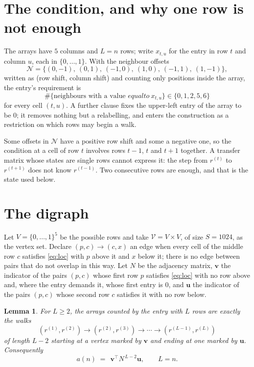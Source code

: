 \documentclass[11pt,a4paper]{article}
\theoremstyle{plain}
\newtheorem{lemma}[theorem]{Lemma}
\theoremstyle{definition}
\begin{document}
\section{The condition, and why one row is not enough}

The arrays have $5$ columns and $L=n$ rows; write $x_{t,u}$ for the entry in
row $t$ and column $u$, each in $\{0,\dots,1\}$. With the neighbour offsets
\[
\mathcal N=\{(0,-1),\ (0,1),\ (-1,0),\ (1,0),\ (-1,1),\ (1,-1)\},
\]
written as (row shift, column shift) and counting only positions inside the array, the
entry's requirement is
\begin{equation}\label{eq:loc}
\#\{\text{neighbours with a value }equal to\ x_{t,u}\}\in\{0,1,2,5,6\}
\end{equation}
for every cell $(t,u)$. A further clause fixes the upper-left entry of the array to be $0$; it removes nothing but a relabelling, and enters the construction as a restriction on which rows may begin a walk.

Some offsets in $\mathcal N$ have a positive row shift and some a negative one, so the
condition at a cell of row $t$ involves rows $t-1$, $t$ and $t+1$ together. A transfer
matrix whose states are single rows cannot express it: the step from $r^{(t)}$ to
$r^{(t+1)}$ does not know $r^{(t-1)}$. Two consecutive rows are enough, and that is
the state used below.

\section{The digraph}

Let $V=\{0,\dots,1\}^{5}$ be the possible rows and take
$\mathcal V=V\times V$, of size $S=1024$, as the vertex set. Declare $(p,c)\to(c,x)$ an edge
when every cell of the middle row $c$ satisfies \eqref{eq:loc} with $p$ above it and $x$
below it; there is no edge between pairs that do not overlap in this way. Let $N$ be the
adjacency matrix, $\mathbf{v}$ the indicator of the pairs $(p,c)$ whose first row $p$
satisfies \eqref{eq:loc} with no row above and, where the entry demands it, whose first entry is $0$, and $\mathbf{u}$ the indicator of
the pairs $(p,c)$ whose second row $c$ satisfies it with no row below.

\begin{lemma}\label{lem:walk}
For $L\ge2$, the arrays counted by the entry with $L$ rows are exactly the walks
\[
(r^{(1)},r^{(2)})\to(r^{(2)},r^{(3)})\to\cdots\to(r^{(L-1)},r^{(L)})
\]
of length $L-2$ starting at a vertex marked by $\mathbf{v}$ and ending at one marked by
$\mathbf{u}$. Consequently
\[
a(n)\;=\;\,\mathbf{v}^{\!\top}N^{\,L-2}\mathbf{u},\qquad L=n .
\]
\end{lemma}
\end{document}
